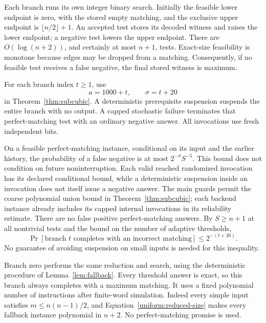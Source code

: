 Each branch runs its own integer binary search. Initially the feasible
lower endpoint is zero, with the stored empty matching, and the exclusive
upper endpoint is $\lfloor n/2\rfloor+1$. An accepted test stores its
decoded witness and raises the lower endpoint; a negative test lowers the
upper endpoint. There are $O(\log(n+2))$, and certainly at most $n+1$,
tests. Exact-size feasibility is monotone because edges may be dropped
from a matching. Consequently, if no feasible test receives a false
negative, the final stored witness is maximum.

For each branch index $t\ge1$, use
\begin{equation}\label{uniform:branch-parameters}
                     a=1000+t,\qquad \sigma=t+20
\end{equation}
in Theorem~\ref{thm:subcubic}. A deterministic prerequisite suspension
suspends the entire branch with no output. A capped stochastic failure
terminates that perfect-matching test with an ordinary negative answer.
All invocations use fresh independent bits.

On a feasible perfect-matching instance, conditional on its input and
the earlier history, the probability of a false negative is at most
$2^{-\sigma}S^{-5}$. This bound does not condition on future
noninterruption. Each valid reached randomized invocation has its declared
conditional bound, while a deterministic suspension inside an invocation
does not itself issue a negative answer. The main guards permit the
coarse polynomial union bound in Theorem~\ref{thm:subcubic}; each backend
instance already includes its capped internal invocations in its
reliability estimate. There are no false positive perfect-matching answers.
By $S\ge n+1$ at all nontrivial tests and the bound on the number of
adaptive thresholds,
\begin{equation}\label{uniform:branch-error}
 \Pr[\text{branch $t$ completes with an incorrect matching}]
                         \le 2^{-(t+20)}.
\end{equation}
No guarantee of avoiding suspension on small inputs is needed for this
inequality.

Branch zero performs the same reduction and search, using
the deterministic procedure of Lemma~\ref{lem:fallback}. Every threshold
answer is exact, so this branch always completes with a maximum matching.
It uses a fixed polynomial number of instructions after finite-word
simulation. Indeed every simple input satisfies
$m\le n(n-1)/2$, and Equation~\eqref{uniform:reduced-size} makes every
fallback instance polynomial in $n+2$. No perfect-matching promise is used.

